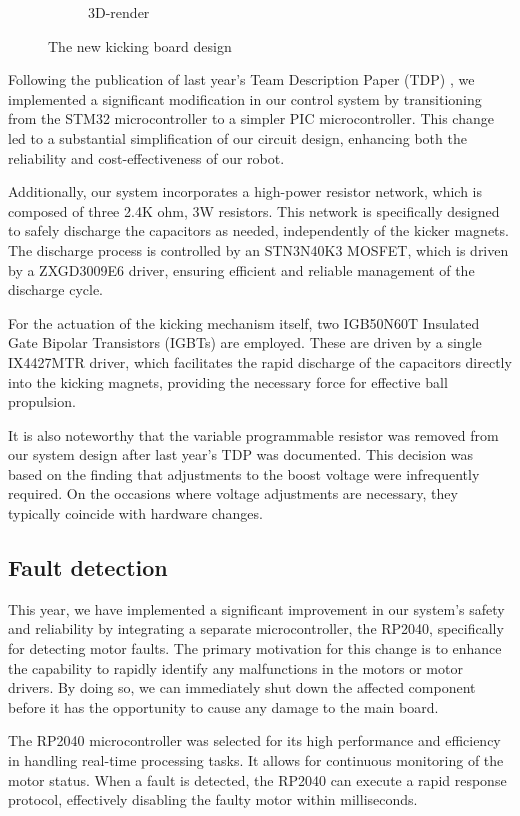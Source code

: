 \documentclass[runningheads]{llncs}
\begin{document}
\begin{figure}
\begin{subfigure}[b]{0.5\textwidth}
        \caption{3D-render}
    \end{subfigure}
    \caption{The new kicking board design}
    \label{fig:mikona}
\end{figure}

Following the publication of last year's Team Description Paper (TDP) \cite{ref_ETDP2023}, we implemented a significant modification in our control system by transitioning from the STM32 microcontroller to a simpler PIC microcontroller. This change led to a substantial simplification of our circuit design, enhancing both the reliability and cost-effectiveness of our robot.

Additionally, our system incorporates a high-power resistor network, which is composed of three 2.4K ohm, 3W resistors. This network is specifically designed to safely discharge the capacitors as needed, independently of the kicker magnets. The discharge process is controlled by an STN3N40K3 MOSFET, which is driven by a ZXGD3009E6 driver, ensuring efficient and reliable management of the discharge cycle.

For the actuation of the kicking mechanism itself, two IGB50N60T Insulated Gate Bipolar Transistors (IGBTs) are employed. These are driven by a single IX4427MTR driver, which facilitates the rapid discharge of the capacitors directly into the kicking magnets, providing the necessary force for effective ball propulsion.

It is also noteworthy that the variable programmable resistor was removed from our system design after last year's TDP was documented. This decision was based on the finding that adjustments to the boost voltage were infrequently required. On the occasions where voltage adjustments are necessary, they typically coincide with hardware changes.
\subsection{Fault detection}

This year, we have implemented a significant improvement in our system's safety and reliability by integrating a separate microcontroller, the RP2040, specifically for detecting motor faults. The primary motivation for this change is to enhance the capability to rapidly identify any malfunctions in the motors or motor drivers. By doing so, we can immediately shut down the affected component before it has the opportunity to cause any damage to the main board.

The RP2040 microcontroller was selected for its high performance and efficiency in handling real-time processing tasks. It allows for continuous monitoring of the motor status. When a fault is detected, the RP2040 can execute a rapid response protocol, effectively disabling the faulty motor within milliseconds.
\end{document}
